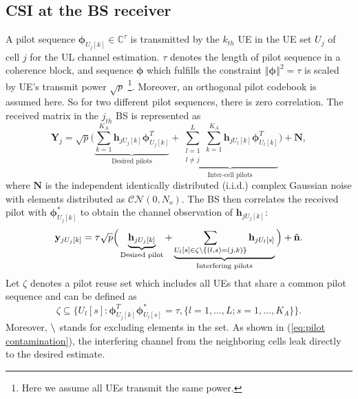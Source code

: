 \subsection{CSI at the BS receiver}
A pilot sequence $\mathbf{\phi}_{U_j[k]}\in \mathbb{C}^{\tau} $ is transmitted by the $k_{th}$ UE in the UE set $U_j$ of cell $j$ for the UL channel estimation. $\tau$ denotes the length of pilot sequence in a coherence block, and sequence $\mathbf{{\phi}}$ which fulfills the constraint $\left\Vert\mathbf{\phi}\right\Vert^2=\tau$ is scaled by UE's transmit power $\sqrt{p}$ \footnote{Here we assume all UEs transmit the same power. }. Moreover, an orthogonal pilot codebook is assumed here. So for two different pilot sequences, there is zero correlation.  The received matrix in the $j_{th}$ BS is represented as 
\begin{equation} \label{eq:Yj}
\mathbf{Y}_j = \sqrt{p}\Big(\underbrace{\sum_{k = 1}^{K_A} \mathbf{h}_{jU_j[k]} \mathbf{\phi}_{U_j[k]}^T}_\text{Desired pilots} +\underbrace{\sum_{\substack{l=1 \\ l\neq j}}^{L}\sum_{k = 1}^{K_A} \mathbf{h}_{jU_l[k]} \mathbf{\phi}_{U_l[k]}^T}_\text{Inter-cell pilots}\Big) + \mathbf{N},   
\end{equation}
where $\mathbf{N}$ is the independent identically distributed
(i.i.d.) complex Gaussian noise with elements distributed as $\mathcal{CN\left(\mathit{0,N_o}\right)}$.
The BS then correlates the received pilot with $\mathbf{\phi}_{U_j[k]}^*$ to obtain the channel observation of $\mathbf{h}_{jU_j[k]}$:%
\begin{equation} 
\mathbf{y}_{jU_j[k]} = \tau\sqrt{p}\Big(\underbrace{\mathbf{h}_{jU_j[k]}}_\text{Desired pilot} +\underbrace{\sum_{U_l[s]\in \\ \zeta\char`\\\{(l,s) = (j,k)\}}\mathbf{h}_{jU_l[s]}}_\text{Interfering pilots}\Big) + \tilde{\mathbf{n}}.   \label{eq:pilot contamination}
\end{equation}
Let $\zeta$ denotes a pilot reuse set which includes all UEs that share a common pilot sequence and can be defined as
\begin{equation}
\zeta \subseteq \{U_l[s]:\mathbf{\phi}_{U_j[k]}^T \mathbf{\phi}_{U_l[s]}^*=\tau, \{l=1,...,L;s=1,...,K_A\}\}.
\end{equation}
Moreover, $\char`\\$ stands for excluding elements in the set. As shown in (\ref{eq:pilot contamination}), the interfering channel from the neighboring cells leak directly to the desired estimate.
